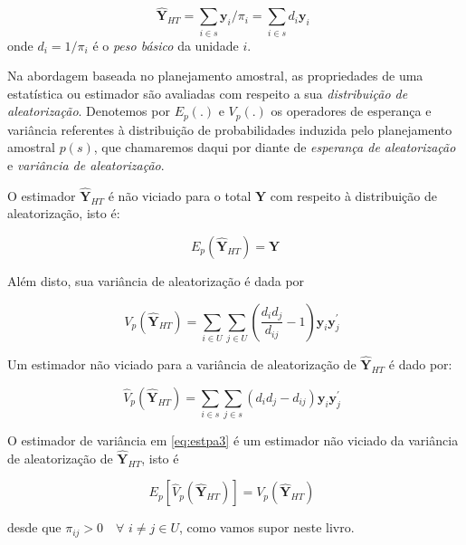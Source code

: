 \documentclass[
  12pt,
  brazilian,
]{book}
\theoremstyle{definition}
\theoremstyle{definition}
\theoremstyle{definition}
\theoremstyle{definition}
\theoremstyle{remark}
\begin{document}
\begin{equation}
\widehat{\mathbf{Y}}_{HT} = \sum_{i \in s} \mathbf{y}_i / \pi_{i} = \sum_{i \in s} d_i \mathbf{y}_i \,\,  \label{eq:estpa1}
\end{equation}
onde \(d_i = 1/\pi_i\) é o \emph{peso básico} da unidade \(i\).

Na abordagem baseada no planejamento amostral, as propriedades de uma estatística ou estimador são avaliadas com respeito a sua \emph{distribuição de aleatorização}. Denotemos por \(E_p(.)\) e \(V_p(.)\) os operadores de esperança e variância referentes à distribuição de probabilidades induzida pelo planejamento amostral \(p(s)\), que chamaremos daqui por diante de \emph{esperança de aleatorização} e \emph{variância de aleatorização}.

O estimador \(\mathbf{\widehat{Y}}_{HT}\) é não viciado para o total \(\mathbf{Y}\) com respeito à distribuição de aleatorização, isto é:

\[
E_p \left( \mathbf{\widehat{Y}}_{HT} \right) = \mathbf{Y} 
\]

Além disto, sua variância de aleatorização é dada por

\begin{equation}
V_p \left( \mathbf{\widehat{Y}}_{HT} \right) = \sum_{i \in U} \sum_{j \in U} \left( \frac{d_i d_j}{d_{ij}} - 1 \right) \mathbf{y}_i {\mathbf{y}^\prime_j}  \,\,\,  \label{eq:estpa2}
\end{equation}

Um estimador não viciado para a variância de aleatorização de \(\mathbf{ \widehat{Y}}_{HT}\) é dado por:

\begin{equation}
\widehat V_p \left( \mathbf{\widehat{Y}}_{HT} \right) =\sum_{i \in s} \sum_{j \in s} \left( {d_i d_j} - d_{ij} \right) \mathbf{y}_i {\mathbf{y}^\prime_j}  \,\,\, \label{eq:estpa3}
\end{equation}

O estimador de variância em \eqref{eq:estpa3} é um estimador não viciado da variância de aleatorização de \(\mathbf{\widehat{Y}}_{HT}\), isto é

\begin{equation}
E_p \left[ \widehat V_p \left( \mathbf{\widehat{Y}}_{HT} \right) \right] = V_p \left( \mathbf{\widehat{Y}}_{HT} \right) \,\,\, \label{eq:estpa4}
\end{equation}

desde que \(\pi_{ij} > 0 \quad \forall\,\, i \neq j \in U\), como vamos supor neste livro.
\end{document}
